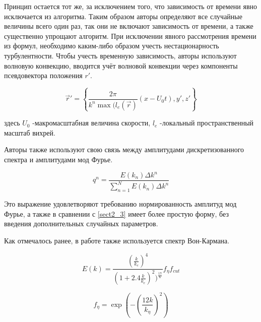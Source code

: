 Принцип остается тот же, за исключением того, что зависимость от времени явно исключается из алгоритма. Таким образом авторы определяют все случайные величины всего один раз, так они не включают зависимость от времени, а также существенно упрощают алгоритм. При исключении явного рассмотрения времени из формул, необходимо каким-либо образом учесть нестационарность турбулентности. Чтобы учесть временную зависимость, авторы используют волновую конвекцию, вводится учёт волновой конвекции через компоненты псевдовектора положения $r'$.

\begin{equation}
    \label{eq:spectral_equation21}
    \vec r' = \left\{ \frac{2 \pi}{k^n \max{(l_e(\vec r)}} (x - U_0 t), y', z'\right\}
\end{equation}

здесь $U_0$ -макромасштабная величина скорости, $l_e$ -локальный пространственный масштаб вихрей.

Авторы также используют свою связь между амплитудами дискретизованного спектра и амплитудами мод Фурье.

\begin{equation}
    \label{eq:spectral_equation21_2}
    q^n = \frac{E(k_n) \Delta k^n}{\sum_{n=1}^N E(k_n) \Delta k^n}
\end{equation}

Это выражение удовлетворяют требованию нормированность амплитуд мод Фурье, а также в сравнении с \ref{sect2_3} имеет более простую форму, без введения дополнительных случайных параметров.

Как отмечалось ранее, в работе также используется спектр Вон-Кармана.

\begin{equation}
    \label{eq:spectral_equation22}
    E(k) = \frac{(\frac{k}{k_e})^4}{(1 + 2.4 \frac{k}{k_e})^2) ^ {\frac{17}{6}}} f_{\eta} f_{cut} 
\end{equation}

\begin{equation}
    \label{eq:spectral_equation23}
    f_{\eta} = \exp{(-(\frac{12 k}{k_\eta})^2)} 
\end{equation}

